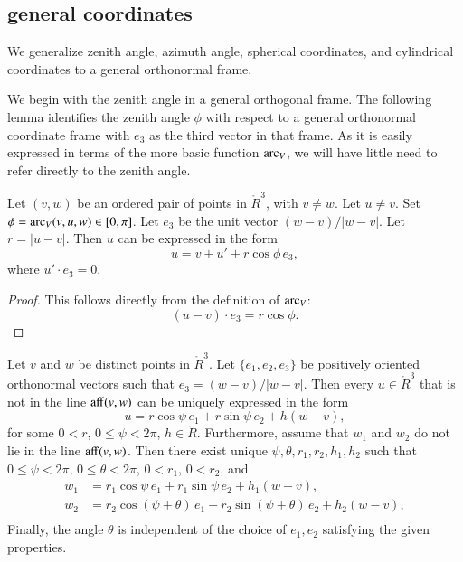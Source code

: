 \subsection{general coordinates}

We generalize zenith angle, azimuth angle,
spherical coordinates, and cylindrical coordinates 
to a general orthonormal frame.

We begin with the zenith angle in a general orthogonal frame.
The following lemma identifies the zenith angle $\phi$ with respect to
a general orthonormal coordinate frame with $e_3$ as the third
vector in that frame.  As it is easily expressed in terms
of the more basic function $\operatorname{arc}_V$, 
we will have little need to refer directly to the zenith angle.

\begin{lemma}[zenith]
Let $(v,w)$ be an ordered pair of points in $\ring{R}^3$, with $v\ne w$.
Let $u\ne v$.  Set $\phi = \operatorname{arc}_V(v,u,w)\in[0,\pi]$.
Let $e_3$ be the unit vector $(w-v)/|w-v|$.  Let $r = |u-v|$.
Then $u$
can be expressed in the form
   $$
   u = v + u' +
   r\cos\phi\, e_3,
   $$
where $u'\cdot e_3 = 0$.
\end{lemma}

\begin{proof} This follows directly from the definition of $\operatorname{arc}_V$:
  $$(u-v)\cdot e_3 = r\cos\phi.$$
\end{proof}



\begin{lemma}
Let $v$ and $w$ be distinct points in 
$\ring{R}^3$.  Let $\{e_1,e_2,e_3\}$ be positively oriented orthonormal
vectors such that $e_3 = (w-v)/|w-v|$.
Then every
$u\in\ring{R}^3$ that is not in the line ${\operatorname{aff}}(v,w)$
can be uniquely expressed in the form
   $$
   u = r\cos\psi\, e_1 + r\sin\psi\, e_2 + h (w-v),
   $$
for some $0< r$, $0\le \psi < 2\pi$, $h\in\ring{R}$.
Furthermore,
assume that $w_1$ and $w_2$ do
not lie in the line ${\operatorname{aff}}(v,w)$.
Then there exist unique $\psi,\theta,r_1,r_2,h_1,h_2$
 such
that $0\le\psi<2\pi$, $0\le\theta < 2\pi$, $0 < r_1$, $0 < r_2$, and
  $$
  \begin{array}{lll}
    w_1 &= r_1\cos\psi\, e_1 + r_1\sin\psi\, e_2 + h_1(w-v),\\
    w_2 &=  r_2\cos(\psi+\theta)\, e_1 + r_2\sin(\psi+\theta)\, e_2 
     + h_2(w-v),\\
\end{array}
  $$
Finally, the angle $\theta$ is independent of the choice of $e_1,e_2$
satisfying the given properties.
\end{lemma}

